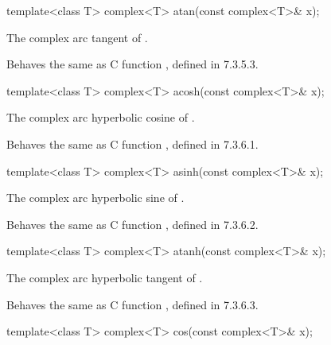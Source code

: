 %
%
\begin{itemdecl}
template<class T> complex<T> atan(const complex<T>& x);
\end{itemdecl}

\begin{itemdescr}
\pnum
\returns The complex arc tangent of .

\pnum
\remarks
Behaves the same as C function ,
defined in 7.3.5.3.
\end{itemdescr}

%
%
\begin{itemdecl}
template<class T> complex<T> acosh(const complex<T>& x);
\end{itemdecl}

\begin{itemdescr}
\pnum
\returns The complex arc hyperbolic cosine of .

\pnum
\remarks
Behaves the same as C function ,
defined in 7.3.6.1.
\end{itemdescr}

%
%
\begin{itemdecl}
template<class T> complex<T> asinh(const complex<T>& x);
\end{itemdecl}

\begin{itemdescr}
\pnum
\returns The complex arc hyperbolic sine of .

\pnum
\remarks
Behaves the same as C function ,
defined in 7.3.6.2.
\end{itemdescr}

%
%
\begin{itemdecl}
template<class T> complex<T> atanh(const complex<T>& x);
\end{itemdecl}

\begin{itemdescr}
\pnum
\returns The complex arc hyperbolic tangent of .

\pnum
\remarks
Behaves the same as C function ,
defined in 7.3.6.3.
\end{itemdescr}

%
\begin{itemdecl}
template<class T> complex<T> cos(const complex<T>& x);
\end{itemdecl}

